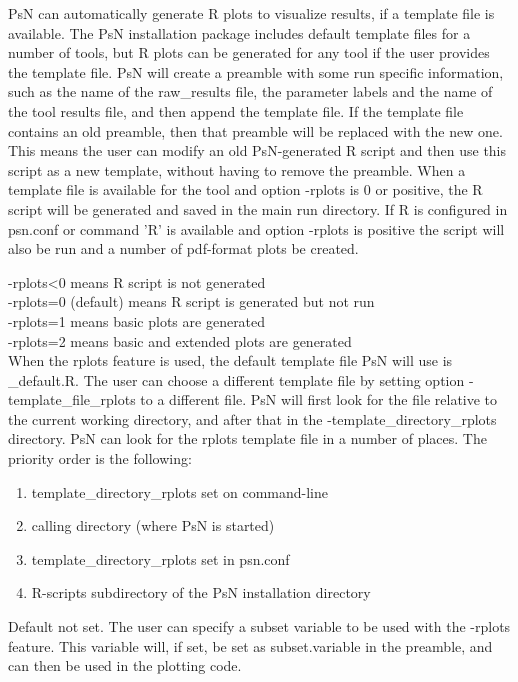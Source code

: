 
PsN can automatically generate R plots to visualize results, if a template file is available.
The PsN installation package includes default template files for a number of tools,
but R plots can be generated for any tool if the user provides the template file.
PsN will create a preamble with some run specific information, 
such as the name of the raw\_results file, the parameter labels and the name of
the tool results file,
and then append 
the template file.
If the template file contains an old preamble, then that preamble will be replaced with 
the new one. This means
the user can modify an old PsN-generated R script and then use this script as a new template,
without having to remove the preamble.
When a template file is available for the tool and option \mbox{-rplots} is 0 or positive, 
the R script will be generated and saved in the main
run directory. 
If R is configured in psn.conf or command 'R' is available and option -rplots is positive 
the script will also be run and a number of pdf-format plots be created.

\rplotsconditions

\begin{optionlist}
-rplots<0 means R script is not generated\\ 
-rplots=0 (default) means R script is generated but not run\\ 
-rplots=1 means basic plots are generated\\													  
-rplots=2 means basic and extended plots are generated\\													  
\nextopt
{}
When the rplots feature is used, the default template file PsN will use is 
\guidetoolname\_default.R. 
The user can choose a different template file
by setting option -template\_file\_rplots to a different file. 
PsN will first look for the file relative to the current working directory, 
and after that in the -template\_directory\_rplots directory.
\nextopt
{}
PsN can look for the rplots template file in a number of places. The priority order is the
following:
\begin{enumerate}
\item template\_directory\_rplots set on command-line 
\item calling directory (where PsN is started)
\item template\_directory\_rplots set in psn.conf 
\item R-scripts subdirectory of the PsN installation directory
\end{enumerate}
\nextopt
{}
Default not set. The user can specify a subset variable to be used with the -rplots feature. 
This variable
will, if set, be set as subset.variable in the preamble,
and can then be used in the plotting code. 
\nextopt
\end{optionlist}
